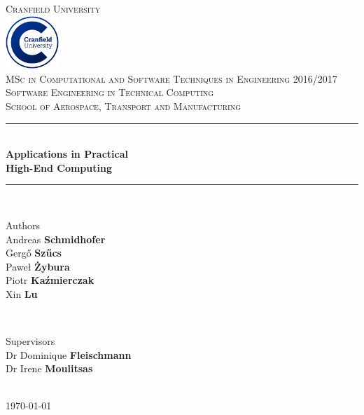 \documentclass[a4paper, 11pt, article]{report}
\begin{document}
\titleformat{\chapter}{\bf\huge}{\thechapter}{20pt}{\huge}

   
\begin{titlepage}
	\newcommand{\HRule}{\rule{\linewidth}{0.5mm}}
	\center
	
    \textsc{\LARGE Cranfield University}\\[0.8cm]
    \includegraphics[width=2cm]{images/cranfield}\\[0.8cm]
    \textsc{\Large MSc in Computational and Software Techniques in Engineering 2016/2017}\\[0.8cm]
    \textsc{\large Software Engineering in Technical Computing}\\
    \textsc{\large School of Aerospace, Transport and Manufacturing}\\[1.1cm]
       
    \HRule \\[0.4cm]
    {\huge \bfseries Applications in Practical  \\[0.5cm]
    	High-End Computing}\\[0.3cm]
    \LARGE\HRule \\[1.5cm]
       
    \begin{minipage}{1.1\textwidth}
    	\begin{flushleft} \large
        	{Authors}\\
            Andreas \textbf{Schmidhofer} \\
            Gergő \textbf{Szűcs} \\
            Paweł \textbf{Żybura} \\ 
            Piotr \textbf{Kaźmierczak} \\
            Xin \textbf{Lu}
        \end{flushleft}
    \end{minipage}
	\\[0.9cm] 
    \begin{minipage}{0.9\textwidth}
    	\begin{flushright} \large
        	{Supervisors}
            \\ Dr Dominique \textbf{Fleischmann}
            \\ Dr  Irene \textbf{Moulitsas}
        \end{flushright}
    \end{minipage}\\[1cm]
       
    \vfill
    {\large \today}
    \clearpage
\end{titlepage}
\end{document}
